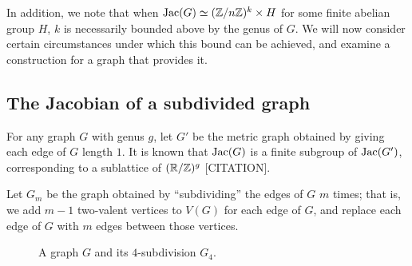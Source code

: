 \documentclass{amsart}
\begin{document}
In addition, we note that when $\operatorname{Jac}(G) \simeq (\mathbb{Z}/n\mathbb{Z})^k \times H$
for some finite abelian group $H$, $k$ is necessarily bounded above by
the genus of $G$. We will now consider certain circumstances under
which this bound can be achieved, and examine a construction for a
graph that provides it.

\subsection{The Jacobian of a subdivided graph}

For any graph $G$ with genus $g$, let $G'$ be the metric graph
obtained by giving each edge of $G$ length $1$. It is known that
$\operatorname{Jac}(G)$ is a finite subgroup of $\operatorname{Jac}(G')$, corresponding to a
sublattice of $(\mathbb{R}/\mathbb{Z})^g$ [CITATION].

Let $G_m$ be the graph obtained by ``subdividing'' the edges of $G$
$m$ times; that is, we add $m-1$ two-valent vertices to $V(G)$ for
each edge of $G$, and replace each edge of $G$ with $m$ edges between
those vertices. 

\begin{figure}[H]
  \begin{center}
  \end{center}
  \caption{A graph $G$ and its $4$-subdivision $G_4$.}
\end{figure}
\end{document}
